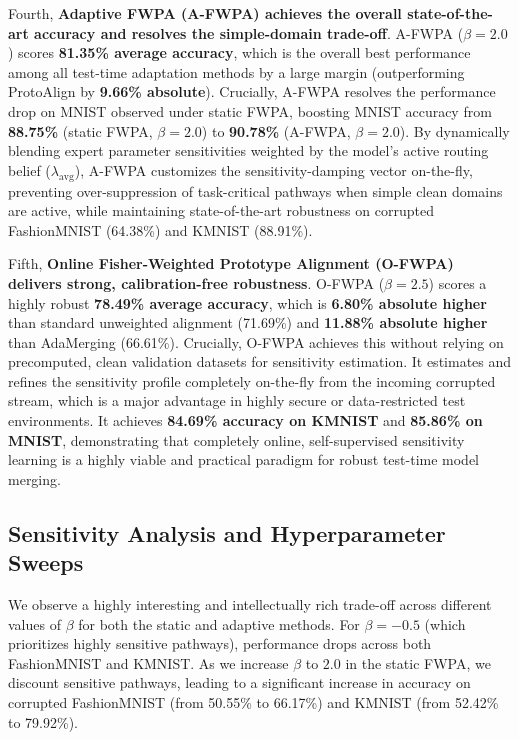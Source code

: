 \documentclass{article}
\theoremstyle{plain}
\theoremstyle{definition}
\theoremstyle{remark}
\begin{document}
Fourth, \textbf{Adaptive FWPA (A-FWPA) achieves the overall state-of-the-art accuracy and resolves the simple-domain trade-off}.
A-FWPA ($\beta = 2.0$) scores \textbf{81.35\% average accuracy}, which is the overall best performance among all test-time adaptation methods by a large margin (outperforming ProtoAlign by \textbf{9.66\% absolute}). Crucially, A-FWPA resolves the performance drop on MNIST observed under static FWPA, boosting MNIST accuracy from \textbf{88.75\%} (static FWPA, $\beta=2.0$) to \textbf{90.78\%} (A-FWPA, $\beta=2.0$). By dynamically blending expert parameter sensitivities weighted by the model's active routing belief ($\lambda_{\text{avg}}$), A-FWPA customizes the sensitivity-damping vector on-the-fly, preventing over-suppression of task-critical pathways when simple clean domains are active, while maintaining state-of-the-art robustness on corrupted FashionMNIST (64.38\%) and KMNIST (88.91\%).

Fifth, \textbf{Online Fisher-Weighted Prototype Alignment (O-FWPA) delivers strong, calibration-free robustness}. O-FWPA ($\beta = 2.5$) scores a highly robust \textbf{78.49\% average accuracy}, which is \textbf{6.80\% absolute higher} than standard unweighted alignment (71.69\%) and \textbf{11.88\% absolute higher} than AdaMerging (66.61\%). Crucially, O-FWPA achieves this without relying on precomputed, clean validation datasets for sensitivity estimation. It estimates and refines the sensitivity profile completely on-the-fly from the incoming corrupted stream, which is a major advantage in highly secure or data-restricted test environments. It achieves \textbf{84.69\% accuracy on KMNIST} and \textbf{85.86\% on MNIST}, demonstrating that completely online, self-supervised sensitivity learning is a highly viable and practical paradigm for robust test-time model merging.

\subsection{Sensitivity Analysis and Hyperparameter Sweeps}
We observe a highly interesting and intellectually rich trade-off across different values of $\beta$ for both the static and adaptive methods.
For $\beta = -0.5$ (which prioritizes highly sensitive pathways), performance drops across both FashionMNIST and KMNIST. As we increase $\beta$ to $2.0$ in the static FWPA, we discount sensitive pathways, leading to a significant increase in accuracy on corrupted FashionMNIST (from 50.55\% to 66.17\%) and KMNIST (from 52.42\% to 79.92\%).
\end{document}
